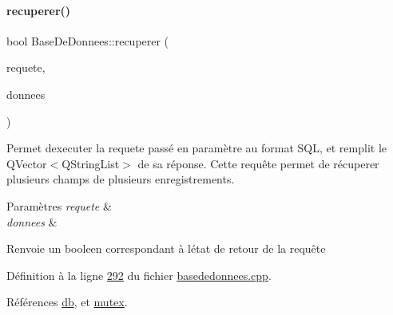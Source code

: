 \paragraph{\texorpdfstring{recuperer()}{recuperer()}\hspace{0.1cm}{\footnotesize\ttfamily [4/4]}}
{\footnotesize\ttfamily bool Base\+De\+Donnees\+::recuperer (\begin{DoxyParamCaption}\item[{Q\+String}]{requete,  }\item[{Q\+Vector$<$ Q\+String\+List $>$ \&}]{donnees }\end{DoxyParamCaption})}



Permet d\textquotesingle{}executer la requete passé en paramètre au format S\+QL, et remplit le Q\+Vector$<$\+Q\+String\+List$>$ de sa réponse. Cette requête permet de récuperer plusieurs champs de plusieurs enregistrements. 


\begin{DoxyParams}{Paramètres}
{\em requete} & \\
\hline
{\em donnees} & \\
\hline
\end{DoxyParams}
\begin{DoxyReturn}{Renvoie}
un booleen correspondant à l\textquotesingle{}état de retour de la requête 
\end{DoxyReturn}


Définition à la ligne \hyperlink{basededonnees_8cpp_source_l00292}{292} du fichier \hyperlink{basededonnees_8cpp_source}{basededonnees.\+cpp}.



Références \hyperlink{basededonnees_8h_source_l00030}{db}, et \hyperlink{basededonnees_8h_source_l00031}{mutex}.


